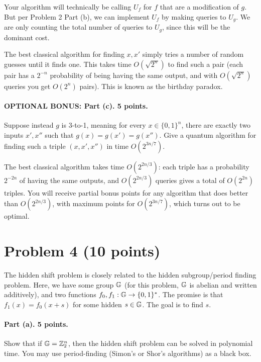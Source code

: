 \documentclass{article}
\begin{document}
\begin{remark}Your algorithm will technically be calling $U_f$ for $f$ that are a modification of $g$. But per Problem 2 Part (b), we can implement $U_f$ by making queries to $U_g$. We are only counting the total number of queries to $U_g$, since this will be the dominant cost.
\end{remark}

\begin{remark}The best classical algorithm for finding $x,x'$ simply tries a number of random guesses until it finds one. This takes time $O(\sqrt{2^n})$ to find such a pair (each pair has a $2^{-n}$ probability of being having the same output, and with $O(\sqrt{2^n})$ queries you get $O(2^n)$ pairs). This is known as the birthday paradox. \end{remark}

\paragraph{OPTIONAL BONUS: Part (c). 5 points.} Suppose instead $g$ is 3-to-1, meaning for every $x\in \{0,1\}^n$, there are exactly two inputs $x',x''$ such that $g(x)=g(x')=g(x'')$. Give a quantum algorithm for finding such a triple $(x,x',x'')$ in time $O(2^{3n/7})$.
\begin{remark}The best classical algorithm takes time $O(2^{2n/3})$: each triple has a probability $2^{-2n}$ of having the same outputs, and $O(2^{2n/3})$ queries gives a total of $O(2^{2n})$ triples. You will receive partial bonus points for any algorithm that does better than $O(2^{2n/3})$, with maximum points for $O(2^{3n/7})$, which turns out to be optimal.
\end{remark}


\section{Problem 4 (10 points)}

The hidden shift problem is closely related to the hidden subgroup/period finding problem. Here, we have some group ${\mathbb{G}}$ (for this problem, ${\mathbb{G}}$ is abelian and written additively), and two functions $f_0,f_1:{\mathbb{G}}\rightarrow\{0,1\}^*$. The promise is that $f_1(x)=f_0(x+s)$ for some hidden $s\in {\mathbb{G}}$. The goal is to find $s$.

\paragraph{Part (a). 5 points.} Show that if ${\mathbb{G}}={\mathbb{Z}}_2^n$, then the hidden shift problem can be solved in polynomial time. You may use period-finding (Simon's or Shor's algorithms) as a black box.
\end{document}

